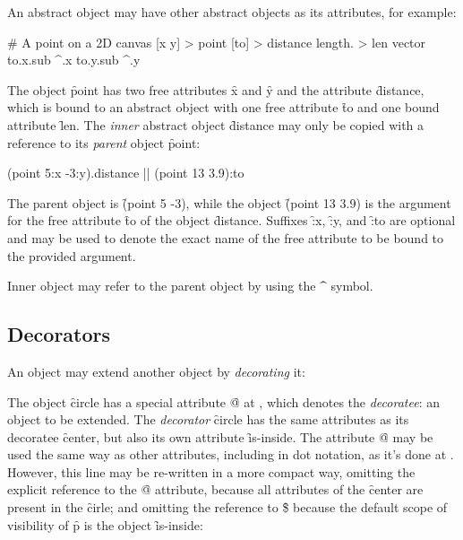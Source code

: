 An abstract object may have other abstract objects as its attributes,
for example:

\begin{eocode}
# A point on a 2D canvas
[x y] > point
  [to] > distance
    length. > len
      vector
        to.x.sub ^.x
        to.y.sub ^.y
\end{eocode}

The object \f{point} has two free attributes \f{x} and \f{y}
and the attribute \f{distance}, which is bound to an abstract
object with one free attribute \f{to} and one bound attribute \f{len}.
The \emph{inner} abstract object \f{distance} may only be copied
with a reference to its \emph{parent} object \f{point}:

\begin{eocode}
(point 5:x -3:y).distance |$\label{ln:point-copy}$|
  (point 13 3.9):to
\end{eocode}

The parent object is \f{(point 5 -3)}, while the object \f{(point 13 3.9)}
is the argument for the free attribute \f{to} of the object \f{distance}.
Suffixes \f{:x}, \f{:y}, and \f{:to} are optional and may be used
to denote the exact name of the free attribute to be bound to the
provided argument.

Inner object may refer to the parent object by using the \f{\^{}} symbol.

\subsection{Decorators}

An object may extend another object by \emph{decorating} it:


The object \f{circle} has a special attribute \f{@}
at , which denotes
the \emph{decoratee}: an object to be extended. The \emph{decorator} \f{circle}
has the same attributes as its decoratee \f{center}, but also
its own attribute \f{is-inside}. The attribute \f{@} may be used
the same way as other attributes, including in dot notation, as it's done
at . However, this line
may be re-written in a more compact way, omitting the explicit
reference to the \f{@} attribute, because all attributes
of the \f{center} are present in the \f{cirle};
and omitting the reference to \f{\$} because the default scope of visibility of
\f{p} is the object \f{is-inside}:


